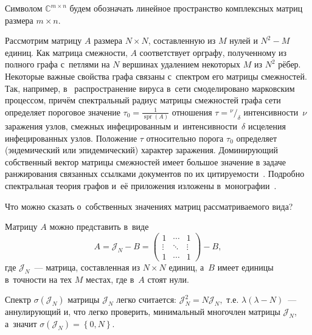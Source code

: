 Символом \( \mathbb{C}^{m\times n} \)
будем обозначать линейное пространство
комплексных матриц размера \( m\times n \).

Рассмотрим матрицу \( A \) размера \( N{\times}N \),
 составленную из \( M \) нулей и \( N^2 - M \) единиц.
Как матрица смежности, \( A \) соответствует орграфу,
 полученному из полного графа с~петлями на \( N \) вершинах
 удалением некоторых \( M \) из \( N^2 \) р\"ебер.
Некоторые важные свойства графа связаны с~спектром его матрицы смежностей.
Так, например, в~\cite{wang2003epidemic,chakrabarti2008epidemic}
 распространение вируса в~сети смоделировано марковским процессом,
 причём спектральный радиус матрицы смежностей графа сети
 определяет пороговое значение
 \( \tau_0=\frac{1}{\operatorname{spr}(A)} \)
 отношения \( \tau = {^\nu/_\delta} \)
 интенсивности~\( \nu \) заражения узлов, смежных инфецированным
 и~интенсивности~\( \delta \) исцеления инфецированных узлов.
 Положение \(\tau\) относительно порога \({\tau_0}\) определяет
 (эндемический или эпидемический) характер заражения.
Доминирующий собственный вектор матрицы смежностей
имеет большое значение в задаче
ранжирования связанных ссылками документов
по их цитируемости~\cite{bonacich1972factoring,ilprints422}.
Подробно спектральная теория графов и~е\"е приложения
изложены в~монографии~\cite{cvetkovic1980spectra}.

Что можно сказать о~собственных значениях матриц рассматриваемого вида?

Матрицу \( A \) можно представить в~виде
\[ A = \mathcal{J}_N - B =
    \begin{pmatrix}1 & \cdots & 1\\ \vdots & \ddots & \vdots \\ 1 & \cdots & 1\end{pmatrix} - B, \]
 где \( \mathcal{J}_N \)~--- матрица, составленная из \( N{\times}N \) единиц,
 а~\( B \) имеет единицы в~точности на тех \( M \) местах,
 где в~\( A \) стоят нули.

Спектр \( \sigma\left( \mathcal{J}_N \right) \)
 матрицы \( \mathcal{J}_N \) легко считается:
 \( \mathcal{J}_N^2 = N \mathcal{J}_N, \) т.е.
 \( \lambda(\lambda - N) \)~--- аннулирующий и, что легко проверить,
 минимальный многочлен матрицы \( \mathcal{J}_N \), а~значит
 \( \sigma\left( \mathcal{J}_N \right) = \left\{ 0,N \right\}. \)


